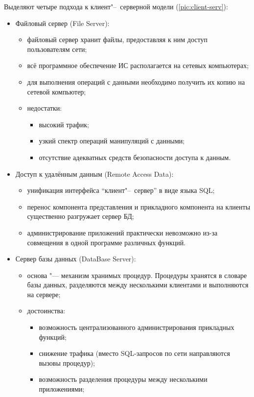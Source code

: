 Выделяют четыре подхода к клиент"--~серверной модели (\autoref{pic:client-serv}):
\begin{itemize}
	\item Файловый сервер (File Server):
		\begin{itemize}
			\item файловый сервер хранит файлы, предоставляя к ним доступ пользователям сети;
			\item всё программное обеспечение ИС располагается на сетевых компьютерах;
			\item для выполнения операций с данными необходимо получить их копию на сетевой компьютер;
			\item недостатки:
				\begin{itemize}
					\item высокий трафик;
					\item узкий спектр операций манипуляций с данными;
					\item отсутствие адекватных средств безопасности доступа к данным.
				\end{itemize}
		\end{itemize}
	\item Доступ к удалённым данным (Remote Access Data):
		\begin{itemize}
			\item унификация интерфейса ``клиент"--~сервер'' в виде языка SQL;
			\item перенос компонента представления и прикладного компонента на клиенты существенно разгружает сервер БД;
			\item администрирование приложений практически невозможно из-за совмещения в одной программе различных функций.
		\end{itemize}
	\item Сервер базы данных (DataBase Server):
		\begin{itemize}
			\item основа "--- механизм хранимых процедур. Процедуры хранятся в словаре базы данных, разделяются между несколькими клиентами и выполняются на сервере;
			\item достоинства:
				\begin{itemize}
					\item возможность централизованного администрирования прикладных функций;
					\item снижение трафика (вместо SQL-запросов по сети направляются вызовы процедур);
					\item возможность разделения процедуры между несколькими приложениями;

\end{itemize}
\end{itemize}
\end{itemize}
